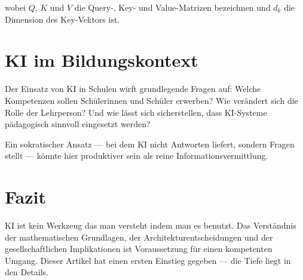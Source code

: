 \documentclass{bfarticle}
\begin{document}
wobei $Q$, $K$ und $V$ die Query-, Key- und Value-Matrizen bezeichnen und
$d_k$ die Dimension des Key-Vektors ist.

\section{KI im Bildungskontext}

Der Einsatz von KI in Schulen wirft grundlegende Fragen auf: Welche
Kompetenzen sollen Schülerinnen und Schüler erwerben? Wie verändert sich
die Rolle der Lehrperson? Und wie lässt sich sicherstellen, dass KI-Systeme
pädagogisch sinnvoll eingesetzt werden?

Ein sokratischer Ansatz — bei dem KI nicht Antworten liefert, sondern
Fragen stellt — könnte hier produktiver sein als reine Informationsvermittlung.

\section{Fazit}

KI ist kein Werkzeug das man versteht indem man es benutzt. Das Verständnis
der mathematischen Grundlagen, der Architekturentscheidungen und der
gesellschaftlichen Implikationen ist Voraussetzung für einen kompetenten
Umgang. Dieser Artikel hat einen ersten Einstieg gegeben — die Tiefe liegt
in den Details.
\end{document}
